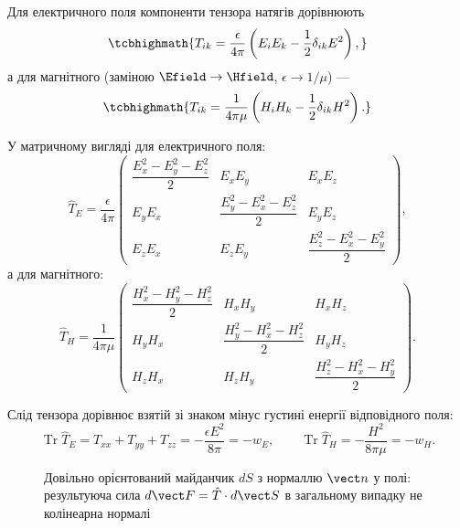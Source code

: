 Для електричного поля компоненти тензора натягів дорівнюють
\begin{equation}\label{eq:MaxwellStressTensor}
	\tcbhighmath{
		T_{ik} = \frac{\epsilon}{4\pi}\left(E_iE_k - \frac12\delta_{ik}E^2\right),
	}
\end{equation}
а для магнітного (заміною $\Efield\to\Hfield$, $\epsilon\to1/\mu$) ---
\begin{equation}\label{eq:MaxwellStressTensorB}
	\tcbhighmath{
		T_{ik} = \frac{1}{4\pi\mu}\left(H_iH_k - \frac12\delta_{ik}H^2\right).
	}
\end{equation}

У матричному вигляді для електричного поля:
\begin{equation}\label{eq:MaxwellStressTensorMatrix}
	\hat{T}_E =
	\frac{\epsilon}{4\pi}
	\begin{pmatrix}
		\dfrac{E_x^2 - E_y^2 - E_z^2}{2} & E_xE_y & E_xE_z \\[2mm]
		E_yE_x & \dfrac{E_y^2 - E_x^2 - E_z^2}{2} & E_yE_z \\[2mm]
		E_zE_x & E_zE_y & \dfrac{E_z^2 - E_x^2 - E_y^2}{2}
	\end{pmatrix},
\end{equation}
а для магнітного:
\begin{equation}\label{eq:MaxwellStressTensorBMatrix}
	\hat{T}_H =
	\frac{1}{4\pi\mu}
	\begin{pmatrix}
		\dfrac{H_x^2 - H_y^2 - H_z^2}{2} & H_xH_y & H_xH_z \\[2mm]
		H_yH_x & \dfrac{H_y^2 - H_x^2 - H_z^2}{2} & H_yH_z \\[2mm]
		H_zH_x & H_zH_y & \dfrac{H_z^2 - H_x^2 - H_y^2}{2}
	\end{pmatrix}.
\end{equation}

Слід тензора дорівнює взятій зі знаком мінус густині енергії відповідного поля:
\begin{equation}\label{eq:StressTrace}
	\operatorname{Tr}\hat{T}_E = T_{xx}+T_{yy}+T_{zz} = -\frac{\epsilon E^2}{8\pi} = -w_E,
	\qquad
	\operatorname{Tr}\hat{T}_H = -\frac{H^2}{8\pi\mu} = -w_H.
\end{equation}

\begin{figure}[h!]\centering
	\caption{Довільно орієнтований майданчик $dS$ з нормаллю $\vect n$ у полі: результуюча сила $d\vect F=\hat T\cdot d\vect S$ в
		загальному випадку не колінеарна нормалі\label{pic:StressElement}}
\end{figure}


